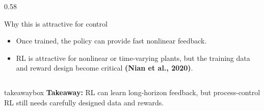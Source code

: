 \documentclass[aspectratio=169]{beamer}
\newcommand{\takeawaybox}[1]{%
\vspace{0.01cm}
\begin{center}
\begin{beamercolorbox}[wd=0.94\textwidth,sep=3pt,center,rounded=true,shadow=false]{takeawaybox}
\scriptsize
\textbf{\textcolor{maroon1}{Takeaway:}} #1
\end{beamercolorbox}
\end{center}
}
\begin{document}
\begin{frame}
\begin{columns}[T,onlytextwidth]
\begin{column}{0.58\textwidth}
\vspace{0.02cm}

\begin{block}{Why this is attractive for control}
\begin{itemize}\justifying
  \setlength\itemsep{0.25ex}
  \item Once trained, the policy can provide fast nonlinear feedback.
  \item RL is attractive for nonlinear or time-varying plants, but the training data and reward design become critical
  {\bf \color{maroon1} \scriptsize (Nian et al., 2020)}.
\end{itemize}
\end{block}

\end{column}
\end{columns}

\vspace{-0.03cm}
\takeawaybox{RL can learn long-horizon feedback, but process-control RL still needs carefully designed data and rewards.}

\end{frame}
\end{document}
